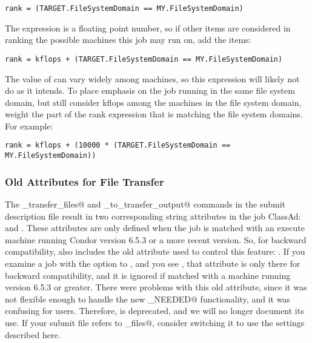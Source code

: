 \begin{verbatim}
rank = (TARGET.FileSystemDomain == MY.FileSystemDomain)
\end{verbatim}

The  expression is a floating point number, so if 
other items are considered in ranking the possible machines this job
may run on, add the items:

\begin{verbatim}
rank = kflops + (TARGET.FileSystemDomain == MY.FileSystemDomain)
\end{verbatim}

The value of  can vary widely among machines,
so this  expression will likely not do as it intends.
To place emphasis on the job running in the same file
system domain,
but still consider kflops among the machines in the file system domain,
weight the part of the rank expression that is matching the file system domains.
For example: 

\begin{verbatim}
rank = kflops + (10000 * (TARGET.FileSystemDomain == MY.FileSystemDomain))
\end{verbatim}

\subsubsection{Old Attributes for File Transfer}

The \verb@should_transfer_files@ and \verb@when_to_transfer_output@
commands in the submit description file result in two corresponding string
attributes in the job ClassAd:  and
.
These attributes are only defined when the job is matched with an
execute machine running Condor version 6.5.3 or a more recent version.
So, for backward compatibility,  also includes the old
attribute used to control this feature: .
If you examine a job with the  option to , and
you see , that attribute is only there for
backward compatibility, and it is ignored if matched with a machine
running version 6.5.3 or greater.  
There were problems with this old attribute, since it
was not flexible enough to handle the new \verb@IF_NEEDED@
functionality, and it was confusing for users.
Therefore,  is deprecated, and we will no longer
document its use.
If your submit file refers to \verb@transfer_files@,
consider switching it to use the settings described here.

